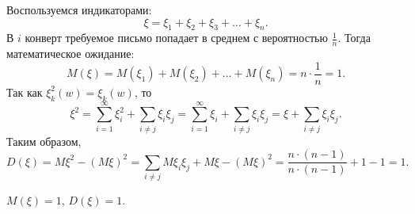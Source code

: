 \begin{solution}
Воспользуемся индикаторами: \[
\xi = \xi_1 + \xi_2 + \xi_3 + \dots + \xi_n
.\] 
В $i$ конверт требуемое письмо попадает в среднем с вероятностью $\frac{1}{n}$. Тогда математическое ожидание: \[
M(\xi) = M(\xi_1) + M(\xi_2) + \dots + M(\xi_n) = n \cdot \frac{1}{n} = 1 
.\] 
Так как $\xi_k^2(w) = \xi_k(w)$, то \[
\xi^2 = \sum_{i=1}^{\infty} \xi^2_i + \sum_{i \neq j} \xi_i \xi_j = \sum_{i = 1}^{\infty} \xi_i +
\sum_{i \neq j}\xi_i \xi_j = \xi + \sum_{i \neq  j}\xi_i \xi_j
.\] 
Таким образом, \[
  D(\xi) = M\xi^2 - (M\xi)^2 = \sum_{i \neq j} M \xi_i \xi_j + M \xi - (M\xi)^2 = \frac{n \cdot (n -
  1)}{n \cdot (n - 1)} + 1 - 1 = 1
.\] 
\end{solution}

\begin{result}
$M(\xi) = 1$, $D(\xi) = 1$.
\end{result}

